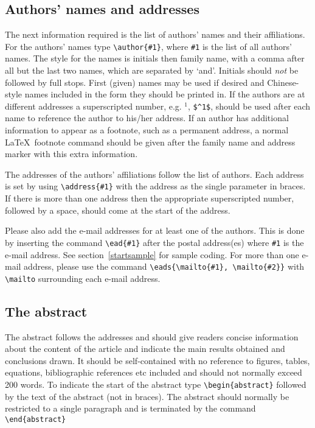\documentclass[12pt]{iopart}
\begin{document}
\subsection{Authors' names and addresses}
The next information required is the list of authors' names and 
their affiliations. For the authors' names type \verb"\author{#1}", 
where \verb"#1" is the 
list of all authors' names. The style for the names is initials then
family name, with a comma after all but the last 
two names, which are separated by `and'. Initials should {\it not} be followed by full stops. First (given) names may be used if 
desired and Chinese-style names included in the form they should be printed in. If the authors are at different addresses a superscripted number, e.g. $^1$, \verb"$^1$", should be used after each 
name to reference the author to his/her address. 
If an author has additional information to appear as a footnote, such as 
a permanent address, a normal \LaTeX\ footnote command
should be given after the family name and address marker 
with this extra information. 

The addresses of the authors' affiliations follow the list of authors. 
Each address is set by using
\verb"\address{#1}" with the address as the single parameter in braces. 
If there is more 
than one address then the appropriate superscripted number, followed by a space, should come at the start of
the address.
 
Please also add the e-mail addresses for at least one of the authors. This is done by inserting the 
command \verb"\ead{#1}" after the postal address(es) where \verb"#1" is the e-mail address.  
See section~\ref{startsample} for sample coding. For more than one e-mail address, please use the command 
\verb"\eads{\mailto{#1}, \mailto{#2}}" with \verb"\mailto" surrounding each e-mail address.

\subsection{The abstract}
The abstract follows the addresses and
should give readers concise information about the content 
of the article and indicate the main results obtained and conclusions 
drawn. It should be self-contained with no reference to 
figures, tables, equations, bibliographic references etc
included and should not normally exceed 200 
words.
To indicate the start 
of the abstract type \verb"\begin{abstract}" followed by the text of the 
abstract (not in braces).  The abstract should normally be restricted 
to a single paragraph and is terminated by the command
\verb"\end{abstract}"
\end{document}
